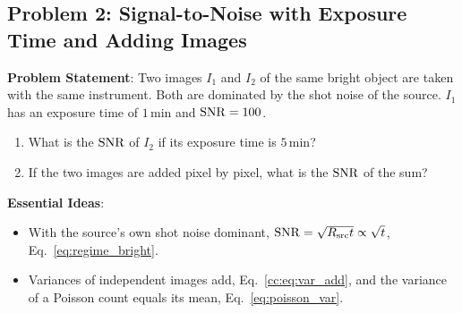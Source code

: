 \subsection{Problem 2: Signal-to-Noise with Exposure Time and Adding Images}
\label{cc:prob:coadd}

\textbf{Problem Statement}: Two images $I_1$ and $I_2$ of the same bright object are taken with the same instrument. Both are dominated by the shot noise of the source. $I_1$ has an exposure time of $1\,\mathrm{min}$ and $\mathrm{SNR}=100$.
\begin{enumerate}[label=(\alph*)]
	\item What is the $\mathrm{SNR}$ of $I_2$ if its exposure time is $5\,\mathrm{min}$?
	\item If the two images are added pixel by pixel, what is the $\mathrm{SNR}$ of the sum?
\end{enumerate}

\textbf{Essential Ideas}:
\begin{itemize}
	\item With the source's own shot noise dominant, $\mathrm{SNR}=\sqrt{R_{\rm src}t}\propto\sqrt t$, Eq.~\eqref{eq:regime_bright}.
	\item Variances of independent images add, Eq.~\eqref{cc:eq:var_add}, and the variance of a Poisson count equals its mean, Eq.~\eqref{eq:poisson_var}.
\end{itemize}

